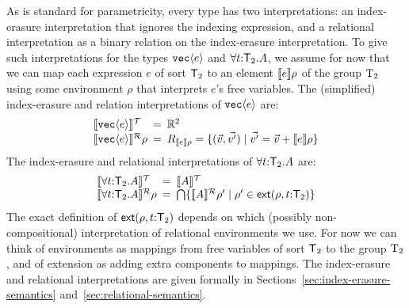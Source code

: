 As is standard for parametricity, every type has two interpretations:
an index-erasure interpretation that ignores the indexing expression,
and a relational interpretation as a binary relation on the
index-erasure interpretation. To give such interpretations for the
types $\textup{\texttt{vec}}\langle e \rangle$ and $\forall t\mathord:\mathsf{T}_2.A$,
we assume for now that we can map each expression $e$ of sort
$\mathsf{T}_2$ to an element $\llbracket e \rrbracket\rho$ of the group $\mathrm{T}_2$
using some environment $\rho$ that interprets $e$'s free
variables. The (simplified) index-erasure and relation interpretations
of $\textup{\texttt{vec}}\langle e \rangle$ are:
\begin{displaymath}
  \begin{array}{l@{\hspace{0.5em}=\hspace{0.5em}}l}
    \tySem{\tyPrim{vec}{e}} & \mathbb{R}^2
    \\ \rsem{\tyPrim{vec}{e}}{}\rho & R_{\sem{e}\rho} = \{
    (\vec{v},\vec{v'}) \sepbar \vec{v'} = \vec{v} + \sem{e}\rho \}
  \end{array}
\end{displaymath}
The index-erasure and relational interpretations of 
$\forall t\mathord:\mathsf{T}_2.A$ are:
\begin{displaymath}
  \begin{array}{l@{\hspace{0.5em}=\hspace{0.5em}}l}
    \tySem{\forall t\mathord:\SynTransl{2}.A} & \tySem{A}
    \\ \rsem{\forall t\mathord:\SynTransl{2}.A}{}\rho & \bigcap\{
    \rsem{A}{}{\rho'} \sepbar \rho' \in
    \extends{\rho}{t\mathord:\SynTransl{2}} \}
  \end{array}
\end{displaymath}
The exact definition of $\mathsf{ext}(\rho,t\mathord:\mathsf{T}_2)$
depends on which (possibly non-compositional) interpretation of
relational environments we use. For now we can think of environments
as mappings from free variables of sort $\mathsf{T}_2$ to the group
$\mathrm{T}_2$, and of extension as adding extra components to
mappings. The index-erasure and relational interpretations are given
formally in Sections~\ref{sec:index-erasure-semantics}
and~\ref{sec:relational-semantics}. %

